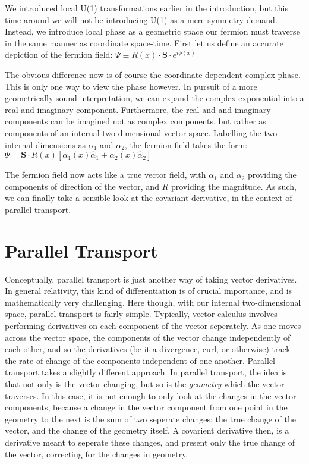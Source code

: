 \documentclass{article}
\begin{document}
        We introduced local U(1) transformations earlier in the introduction, but this time around we will not be introducing U(1) as a mere symmetry demand. Instead, we introduce local phase as a geometric space our fermion must traverse in the same manner as coordinate space-time. First let us define an accurate depiction of the fermion field:
        $\Psi \equiv R(x) \cdot \mathbf{S} \cdot e^{i \phi(x)}$

        The obvious difference now is of course the coordinate-dependent complex phase. This is only one way to view the phase however. In pursuit of a more geometrically sound interpretation, we can expand the complex exponential into a real and imaginary component. Furthermore, the real and and imaginary components can be imagined not as complex components, but rather as components of an internal two-dimensional vector space. Labelling the two internal dimensions as $\alpha_1$ and $\alpha_2$, the fermion field takes the form:
        $\Psi = \mathbf{S} \cdot R(x) \left[ \alpha_1(x) \hat\alpha_1 + \alpha_2(x) \hat\alpha_2 \right]$ 

        The fermion field now acts like a true vector field, with $\alpha_1$ and $\alpha_2$ providing the components of direction of the vector, and $R$ providing the magnitude. As such, we can finally take a sensible look at the covariant derivative, in the context of parallel transport.


\section{Parallel Transport}
        Conceptually, parallel transport is just another way of taking vector derivatives. In general relativity, this kind of differentiation is of crucial importance, and is mathematically very challenging. Here though, with our internal two-dimensional space, parallel transport is fairly simple. Typically, vector calculus involves performing derivatives on each component of the vector seperately. As one moves across the vector space, the components of the vector change independently of each other, and so the derivatives (be it a divergence, curl, or otherwise) track the rate of change of the components independent of one another. Parallel transport takes a slightly different approach. In parallel transport, the idea is that not only is the vector changing, but so is the \textit{geometry} which the vector traverses. In this case, it is not enough to only look at the changes in the vector components, because a change in the vector component from one point in the geometry to the next is the sum of two seperate changes: the true change of the vector, and the change of the geometry itself. A covarient derivative then, is a derivative meant to seperate these changes, and present only the true change of the vector, correcting for the changes in geometry.
\end{document}
